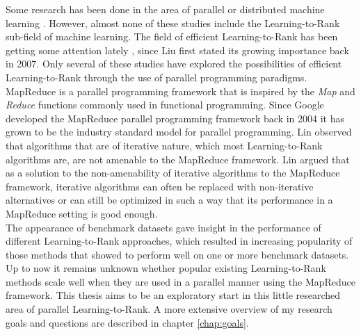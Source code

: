 Some research has been done in the area of parallel or distributed machine learning \cite{Chu2007,Chang2007}. However, almost none of these studies include the Learning-to-Rank sub-field of machine learning. The field of efficient Learning-to-Rank has been getting some attention lately \cite{Asadi2013a,Asadi2013b,Busa-Fekete2012,Sousa2012,Shukla2012}, since Liu \cite{Liu2007} first stated its growing importance back in 2007. Only several of these studies \cite{Sousa2012,Shukla2012} have explored the possibilities of efficient Learning-to-Rank through the use of parallel programming paradigms.\\

MapReduce \cite{Dean2004} is a parallel programming framework that is inspired by the \emph{Map} and \emph{Reduce} functions commonly used in functional programming. Since Google developed the MapReduce parallel programming framework back in 2004 it has grown to be the industry standard model for parallel programming. Lin \cite{Lin2013} observed that algorithms that are of iterative nature, which most Learning-to-Rank algorithms are, are not amenable to the MapReduce framework. Lin argued that as a solution to the non-amenability of iterative algorithms to the MapReduce framework, iterative algorithms can often be replaced with non-iterative alternatives or can still be optimized in such a way that its performance in a MapReduce setting is good enough.\\

The appearance of benchmark datasets gave insight in the performance of different Learning-to-Rank approaches, which resulted in increasing popularity of those methods that showed to perform well on one or more benchmark datasets. Up to now it remains unknown whether popular existing Learning-to-Rank methods scale well when they are used in a parallel manner using the MapReduce framework. This thesis aims to be an exploratory start in this little researched area of parallel Learning-to-Rank. A more extensive overview of my research goals and questions are described in chapter \ref{chap:goals}.\\

